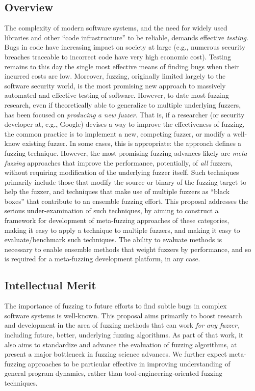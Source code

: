 \centerline{}


\cut{
}

\subsection*{Overview}
\vspace{-2mm}
The complexity of modern software systems, and the need for widely used 
libraries and other ``code infrastructure'' to be reliable, demands effective 
\emph{testing}.  Bugs in code have increasing impact on society at large (e.g., 
numerous security breaches traceable to incorrect code have very high economic 
cost).  Testing remains to this day the single most effective means of finding 
bugs when their incurred costs are low.   Moreover, fuzzing, originally limited largely to 
the software security world, is the most promising new approach to massively 
automated and effective testing of software.   However, to date most fuzzing 
research, even if theoretically able to generalize to multiple underlying 
fuzzers, has been focused on \emph{producing a new fuzzer}.  That is, if a 
researcher (or security developer at, e.g., Google) devises a way to improve 
the effectiveness of fuzzing, the common practice is to implement a new, 
competing fuzzer, or modify a well-know existing fuzzer.  In some cases, this 
is appropriate: the approach defines a fuzzing technique.  However, the most 
promising fuzzing advances likely are \emph{meta-fuzzing} approaches that 
improve the performance, potentially, of \emph{all} fuzzers, without requiring 
modification of the underlying fuzzer itself.  Such techniques primarily 
include those that modify the source or binary of the fuzzing target to help 
the fuzzer, and techniques that make use of multiple fuzzers as ``black boxes'' 
that contribute to an ensemble fuzzing effort.  This proposal addresses the 
serious under-examination of such techniques, by aiming to construct a 
framework for development of meta-fuzzing approaches of these categories, 
making it easy to apply a technique to multiple fuzzers, and making it easy to 
evaluate/benchmark such techniques.  The ability to evaluate methods is 
necessary to enable ensemble methods that weight fuzzers by performance, and so 
is required for a meta-fuzzing development platform, in any case.

\subsection*{Intellectual Merit} 
\vspace{-2mm}
The importance of fuzzing to future efforts to find subtle bugs in complex 
software systems is well-known.  This proposal aims primarily to boost research 
and development in the area of fuzzing methods that can work \emph{for any 
fuzzer}, including future, better, underlying fuzzing algorithms.  As part of 
that work, it also aims to standardize and advance the evaluation of fuzzing 
algorithms, at present a major bottleneck in fuzzing science advances.  We 
further expect meta-fuzzing approaches to be particular effective in improving 
understanding of general program dynamics, rather than 
tool-engineering-oriented fuzzing techniques.
